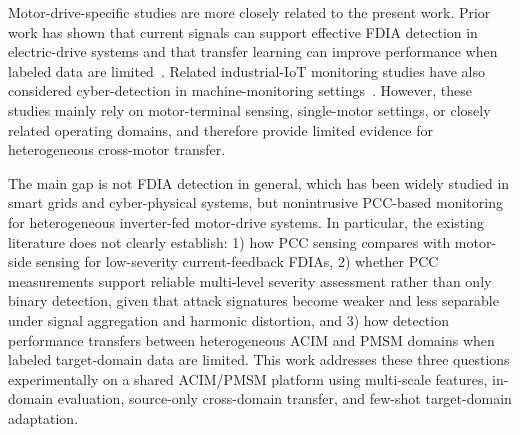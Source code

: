 \documentclass[lettersize,journal]{IEEEtran}
\newcommand{\COMMENTYe}[1]{{\bf\color{red} Ye: #1}}
\begin{document}
Motor-drive-specific studies are more closely related to the present work. Prior work has shown that current signals can support effective FDIA detection in electric-drive systems and that transfer learning can improve performance when labeled data are limited~\cite{Yang2022Fast,Yang2024Enhanced}. Related industrial-IoT monitoring studies have also considered cyber-detection in machine-monitoring settings~\cite{423563247547}. However, these studies mainly rely on motor-terminal sensing, single-motor settings, or closely related operating domains, and therefore provide limited evidence for heterogeneous cross-motor transfer.



The main gap is not FDIA detection in general, which has been widely studied in smart grids and cyber-physical systems, but nonintrusive PCC-based monitoring for heterogeneous inverter-fed motor-drive systems. In particular, the existing literature does not clearly establish: 1) how PCC sensing compares with motor-side sensing for low-severity current-feedback FDIAs, 2) whether PCC measurements support reliable multi-level severity assessment rather than only binary detection, given that attack signatures become weaker and less separable under signal aggregation and harmonic distortion, and 3) how detection performance transfers between heterogeneous ACIM and PMSM domains when labeled target-domain data are limited. This work addresses these three questions experimentally on a shared ACIM/PMSM platform using multi-scale features, in-domain evaluation, source-only cross-domain transfer, and few-shot target-domain adaptation.



\end{document}
